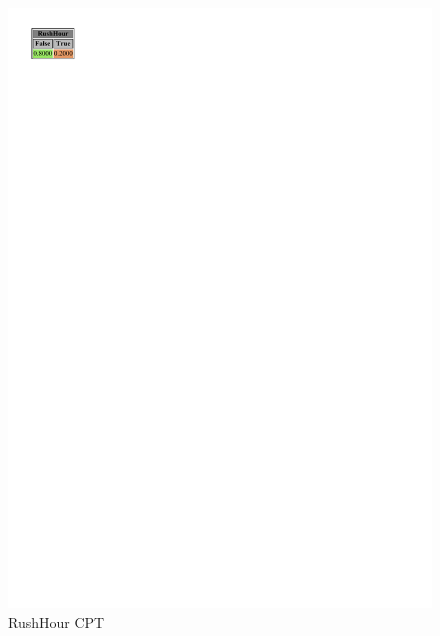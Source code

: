 \documentclass[a4paper,12pt]{article} %
\begin{document}
\begin{figure}[H]
\begin{center}
\begin{minipage}[c]{.3\textwidth}
		\includegraphics[width=.5\linewidth]{../code/rushhour.pdf}	
		\caption*{RushHour CPT}
		\label{fig:rushhour}
	\end{minipage}


\end{center}
\end{figure}
\end{document}

